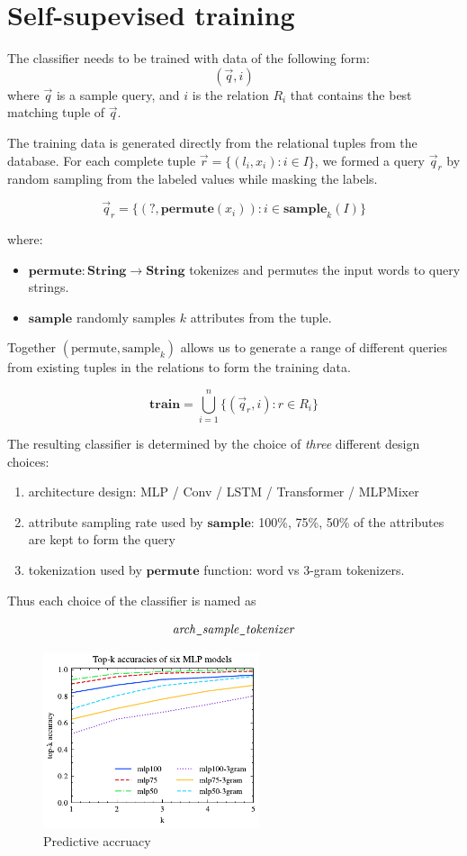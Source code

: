 \documentclass[conference]{IEEEtran}
\begin{document}
\section{Self-supevised training}

The classifier needs to be trained with data of the following form:
$$
(\vec q, i)
$$
where $\vec q$ is a sample query, and $i$ is the relation $R_i$ that contains the best matching
tuple of $\vec q$.

The training data is generated directly from the relational tuples from the database.  For each complete tuple $\vec r = \{(l_i, x_i): i\in I\}$, 
we formed a query $\vec q_r$ by random sampling from
the labeled values while masking the labels.

$$
\vec q_r = \{(?, \mathbf{permute}(x_i)): i\in\mathbf{sample}_k(I)\}
$$

where:
\begin{itemize}
\item $\mathbf{permute}:\mathbf{String}\to\mathbf{String}$
tokenizes and permutes the input words to query strings.
\item $\mathbf{sample}$ randomly samples $k$ attributes from the tuple.
\end{itemize}

Together $(\mathrm{permute}, \mathrm{sample}_k)$ allows us to generate
a range of different queries from existing tuples in the relations to form
the training data.

$$
\mathbf{train} = \bigcup_{i=1}^n\{(\vec q_r, i): r\in R_i\}
$$

The resulting classifier is determined by the choice of {\em three}
different design choices: 

\begin{enumerate}
\item architecture design: MLP / Conv / LSTM / Transformer / MLPMixer
\item attribute sampling rate used by $\mathbf{sample}$: 100\%, 75\%, 50\% of the attributes are kept to form the query
\item tokenization used by $\mathbf{permute}$ function: word vs 3-gram tokenizers.
\end{enumerate}

Thus each choice of the classifier is named as

$${\it arch}\verb|_|{\it sample}\verb|_|{\it tokenizer}$$

\begin{figure}[b]
	\centering
		\centering
		\includegraphics[width=2.5in]{graphics/top_k_mlp_A.pdf}
		\caption{Predictive accruacy}
		\label{fig:top_k_mlp_A}
\end{figure}
\end{document}
